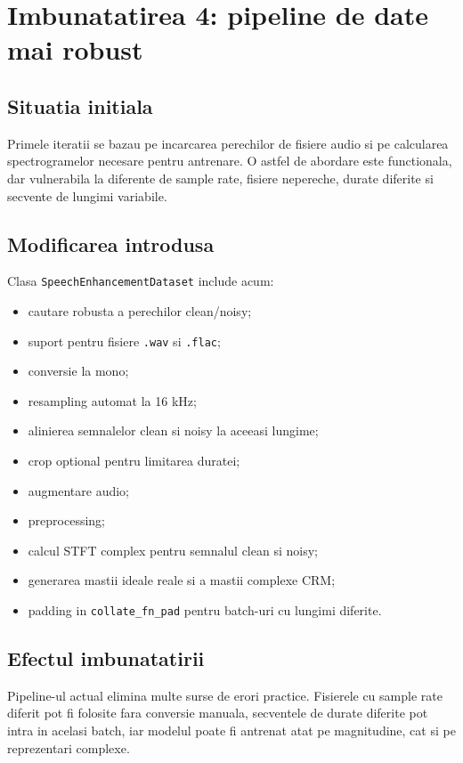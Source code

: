 \documentclass[12pt,a4paper]{article}
\begin{document}
\section{Imbunatatirea 4: pipeline de date mai robust}

\subsection{Situatia initiala}

Primele iteratii se bazau pe incarcarea perechilor de fisiere audio si pe
calcularea spectrogramelor necesare pentru antrenare. O astfel de abordare este
functionala, dar vulnerabila la diferente de sample rate, fisiere nepereche,
durate diferite si secvente de lungimi variabile.

\subsection{Modificarea introdusa}

Clasa \texttt{SpeechEnhancementDataset} include acum:

\begin{itemize}
    \item cautare robusta a perechilor clean/noisy;
    \item suport pentru fisiere \texttt{.wav} si \texttt{.flac};
    \item conversie la mono;
    \item resampling automat la 16 kHz;
    \item alinierea semnalelor clean si noisy la aceeasi lungime;
    \item crop optional pentru limitarea duratei;
    \item augmentare audio;
    \item preprocessing;
    \item calcul STFT complex pentru semnalul clean si noisy;
    \item generarea mastii ideale reale si a mastii complexe CRM;
    \item padding in \texttt{collate\_fn\_pad} pentru batch-uri cu lungimi
    diferite.
\end{itemize}

\subsection{Efectul imbunatatirii}

Pipeline-ul actual elimina multe surse de erori practice. Fisierele cu sample
rate diferit pot fi folosite fara conversie manuala, secventele de durate diferite
pot intra in acelasi batch, iar modelul poate fi antrenat atat pe magnitudine, cat
si pe reprezentari complexe.
\end{document}
